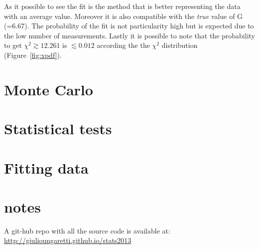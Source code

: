 \documentclass[twocolumn]{article}
\begin{document}
	As it possible to see the fit is the method that is better representing the data with an average value.
	Moreover it is also compatible with the \emph{true} value of G (=6.67).
	The probability of the fit is not particularity high but is expected due to the low number of measurements.
	Lastly it is possible to note that the probability to get $\chi ^2 \gtrsim 12.261 $ is $ \lesssim 0.012$ according the the $\chi ^2$ distribution (Figure~\ref{fig:xpdf}).
\subsection{} %
	\label{sub:}


\section{Monte Carlo} %
\label{sec:monte_carlo}


\section{Statistical tests} %
\label{sec:statistical_tests}



\section{Fitting data} %
\label{sec:fitting_data}

\section{notes}
A git-hub repo with all the source code is available at:
\url{http://giulioungaretti.github.io/stats2013}
\end{document}
